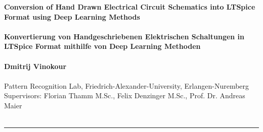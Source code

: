 \documentclass{article}%
\begin{document}
\begin{center}

\textbf{
\huge{Conversion of Hand Drawn Electrical Circuit Schematics into LTSpice Format using Deep Learning Methods}
\\~\\
\large{Konvertierung von Handgeschriebenen Elektrischen Schaltungen in LTSpice Format mithilfe von Deep Learning Methoden}
\\~\\
Dmitrij Vinokour
\\~\\
}
Pattern Recognition Lab, Friedrich-Alexander-University, Erlangen-Nuremberg
\\
Supervisors: Florian Thamm M.Sc., Felix Denzinger M.Sc., Prof. Dr. Andreas Maier
\\~\\
\noindent\rule{\textwidth}{1pt}
\end{center}
\end{document}
